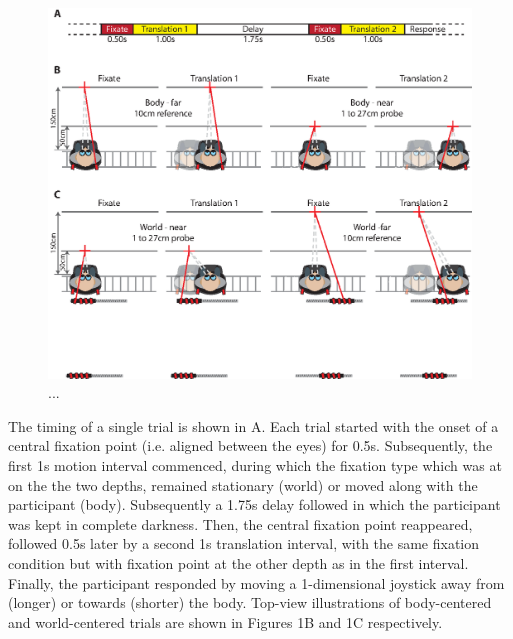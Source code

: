 \begin{figure}
    \includegraphics[width=1.0\textwidth]{src/paper4/paper4_figure1.eps}

    \caption{...}
    \label{p4:fig1}    
\end{figure}
 
The timing of a single trial is shown in A. Each trial started with the onset of a central fixation point (i.e. aligned between the eyes) for 0.5s. Subsequently, the first 1s motion interval commenced, during which the fixation type which was at on the the two depths, remained stationary (world) or moved along with the participant (body). Subsequently a 1.75s delay followed in which the participant was kept in complete darkness. Then, the central fixation point reappeared, followed 0.5s later by a second 1s translation interval, with the same fixation condition but with fixation point at the other depth as in the first interval. Finally, the participant responded by moving a 1-dimensional joystick away from (longer) or towards (shorter) the body. Top-view illustrations of body-centered and world-centered trials are shown in Figures 1B and 1C respectively.

